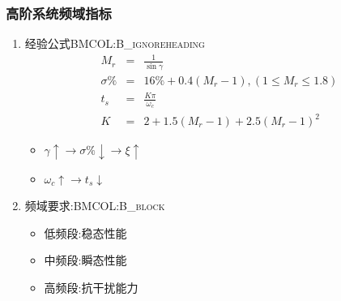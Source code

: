 \documentclass[table]{article}
\begin{document}
\subsubsection{高阶系统频域指标}
\label{sec:org56b31d8}
\begin{enumerate}
\item 经验公式\hfill{}\textsc{BMCOL:B\_ignoreheading}
\label{sec:orgb8887cc}
\begin{eqnarray*}
M_r & = & \frac{1}{\sin\gamma}\\
\sigma\% &=& 16\%+0.4(M_r-1), (1\leq M_r\leq 1.8) \\
t_s &=& \frac{K\pi}{\omega_c}\\
K&=& 2+1.5(M_r-1)+2.5(M_r-1)^2 
\end{eqnarray*}

\begin{itemize}
\item <2->\(\gamma\uparrow \rightarrow \sigma\%\downarrow \rightarrow \xi\uparrow\)
\item <3->\(\omega_c\uparrow \rightarrow t_s\downarrow\)
\end{itemize}

\item 频域要求:\hfill{}\textsc{BMCOL:B\_block}
\label{sec:orgee6812b}
\begin{itemize}
\item 低频段:稳态性能
\item 中频段:瞬态性能
\item 高频段:抗干扰能力
\end{itemize}
\end{enumerate}
\end{document}
